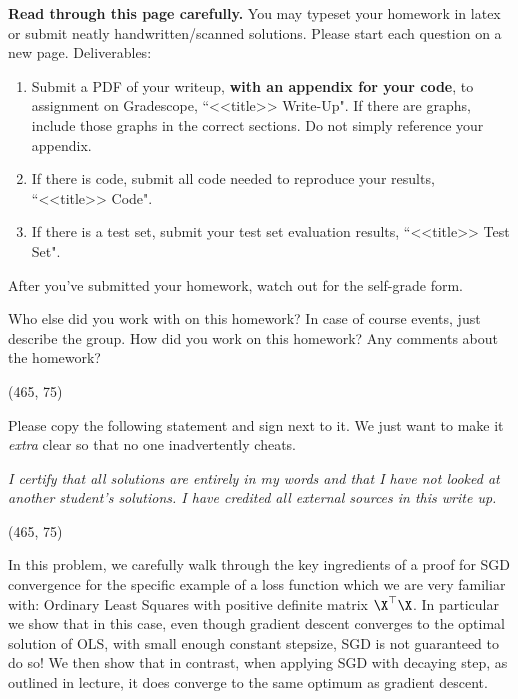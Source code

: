 \documentclass[preview]{standalone}
\begin{document}
\fontsize{12}{15}\selectfont


\textbf{Read through this page carefully.} You may typeset your homework in latex or submit neatly handwritten/scanned solutions. Please start each question on a new page. Deliverables:

\begin{enumerate}
  \item Submit a PDF of your writeup, \textbf{with an appendix for your code}, to assignment on Gradescope, ``<<title>> Write-Up". If there are graphs, include those graphs in the correct sections. Do not simply reference your appendix.
  \item If there is code, submit all code needed to reproduce your results, ``<<title>> Code".
  \item If there is a test set, submit your test set evaluation results, ``<<title>> Test Set".
\end{enumerate}

After you've submitted your homework, watch out for the self-grade form.

\begin{Parts}

\Part Who else did you work with on this homework? In case of course events, just describe the group. How did you work on this homework? Any comments about the homework?

\vspace{15pt}
\framebox(465, 75){}

\Part Please copy the following statement and sign next to it. We just want to make it \textit{extra} clear so that no one inadvertently cheats.

\textit{I certify that all solutions are entirely in my words and that I have not looked at another student's solutions. I have credited all external sources in this write up.}

\vspace{15pt}
\framebox(465, 75){}

\end{Parts}

\pagebreak


\newcommand{\mycomment}[1]{\textcolor{blue}{#1}}
\newcommand{\updt}[1]{\w^{#1}}
\newcommand{\lipcon}{M_g}
\newcommand{\best}{\w^\star}
\newcommand{\EE}{\mathbb{E}}
\newcommand{\tilm}{\tilde{m}}

In this problem, we carefully walk through the key ingredients of a
proof for SGD convergence for the specific example of a loss function
which we are very familiar with: Ordinary Least Squares with positive
definite matrix $\X^\top \X$. In particular we show that in this case,
even though gradient descent converges to the optimal solution of OLS,
with small enough constant stepsize, SGD is not guaranteed to do so!
We then show that in contrast, when applying SGD with decaying step,
as outlined in lecture, it does converge to the same optimum as
gradient descent.
\end{document}
